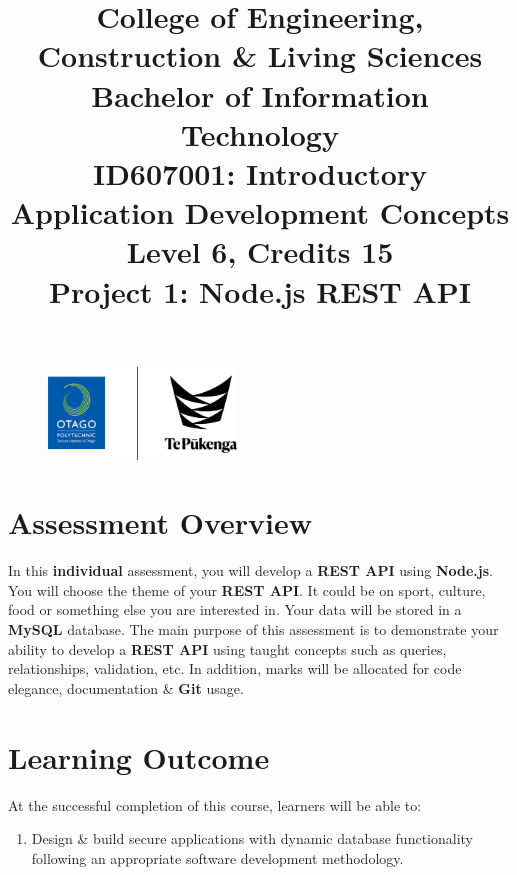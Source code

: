 \documentclass{article}
\author{}
\begin{document}
\begin{figure}
	\centering
	\includegraphics[width=50mm]{../img/logo.png}
\end{figure}

\title{College of Engineering, Construction \& Living Sciences\\Bachelor of Information Technology\\ID607001: Introductory Application Development Concepts\\Level 6, Credits 15\\\textbf{Project 1: Node.js REST API}}
\date{}
\maketitle

\section*{Assessment Overview}
In this \textbf{individual} assessment, you will develop a \textbf{REST API} using \textbf{Node.js}. You will choose the theme of your \textbf{REST API}. It could be on sport, culture, food or something else you are interested in. Your data will be stored in a \textbf{MySQL} database. The main purpose of this assessment is to demonstrate your ability to develop a \textbf{REST API} using taught concepts such as queries, relationships, validation, etc. In addition, marks will be allocated for code elegance, documentation \& \textbf{Git} usage.

\section*{Learning Outcome}
At the successful completion of this course, learners will be able to:
\begin{enumerate}
	\item Design \& build secure applications with dynamic database functionality following an appropriate software development methodology.
\end{enumerate}
\end{document}

